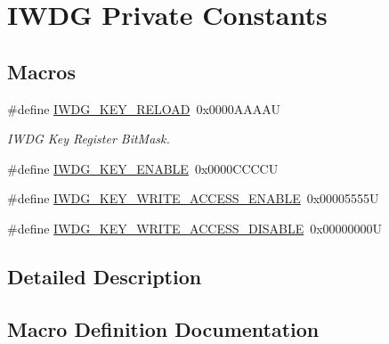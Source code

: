 \hypertarget{group___i_w_d_g___private___constants}{}\section{I\+W\+DG Private Constants}
\label{group___i_w_d_g___private___constants}
\subsection*{Macros}
\begin{DoxyCompactItemize}
\item 
\#define \hyperlink{group___i_w_d_g___private___constants_ga33abf7b7c76dfda6b6380448a1d28966}{I\+W\+D\+G\+\_\+\+K\+E\+Y\+\_\+\+R\+E\+L\+O\+AD}~0x0000\+A\+A\+A\+AU
\begin{DoxyCompactList}\small\item\em I\+W\+DG Key Register Bit\+Mask. \end{DoxyCompactList}\item 
\#define \hyperlink{group___i_w_d_g___private___constants_ga493295d56bb62752982234755612386f}{I\+W\+D\+G\+\_\+\+K\+E\+Y\+\_\+\+E\+N\+A\+B\+LE}~0x0000\+C\+C\+C\+CU
\item 
\#define \hyperlink{group___i_w_d_g___private___constants_ga90fbb0a5e42ed25b44c0330ad75724e6}{I\+W\+D\+G\+\_\+\+K\+E\+Y\+\_\+\+W\+R\+I\+T\+E\+\_\+\+A\+C\+C\+E\+S\+S\+\_\+\+E\+N\+A\+B\+LE}~0x00005555U
\item 
\#define \hyperlink{group___i_w_d_g___private___constants_ga9e63bed9af448ad96c4621e74230a415}{I\+W\+D\+G\+\_\+\+K\+E\+Y\+\_\+\+W\+R\+I\+T\+E\+\_\+\+A\+C\+C\+E\+S\+S\+\_\+\+D\+I\+S\+A\+B\+LE}~0x00000000U
\end{DoxyCompactItemize}


\subsection{Detailed Description}


\subsection{Macro Definition Documentation}
\mbox{\label{group___i_w_d_g___private___constants_ga493295d56bb62752982234755612386f}} 

